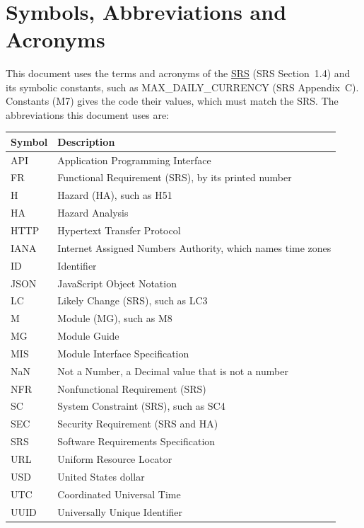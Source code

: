 \documentclass[12pt, titlepage]{article}
\begin{document}
~\newpage

\section{Symbols, Abbreviations and Acronyms}

This document uses the terms and acronyms of the
\href{https://github.com/davislenover/BurnNEarn/blob/main/pdfs/SRS-IEEE/SRS.pdf}{SRS}
(SRS Section~1.4) and its symbolic constants, such as MAX\_DAILY\_CURRENCY
(SRS Appendix~C). Constants (M7) gives the code their values, which must match
the SRS. The abbreviations this document uses are:

\begin{center}
\renewcommand{\arraystretch}{1.2}
\begin{tabular}{l l}
\toprule
\textbf{Symbol} & \textbf{Description}\\
\midrule
API & Application Programming Interface\\
FR & Functional Requirement (SRS), by its printed number\\
H & Hazard (HA), such as H51\\
HA & Hazard Analysis\\
HTTP & Hypertext Transfer Protocol\\
IANA & Internet Assigned Numbers Authority, which names time zones\\
ID & Identifier\\
JSON & JavaScript Object Notation\\
LC & Likely Change (SRS), such as LC3\\
M & Module (MG), such as M8\\
MG & Module Guide\\
MIS & Module Interface Specification\\
NaN & Not a Number, a Decimal value that is not a number\\
NFR & Nonfunctional Requirement (SRS)\\
SC & System Constraint (SRS), such as SC4\\
SEC & Security Requirement (SRS and HA)\\
SRS & Software Requirements Specification\\
URL & Uniform Resource Locator\\
USD & United States dollar\\
UTC & Coordinated Universal Time\\
UUID & Universally Unique Identifier\\
\bottomrule
\end{tabular}
\end{center}
\end{document}
